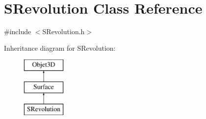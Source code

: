 \hypertarget{classSRevolution}{\section{S\-Revolution Class Reference}
\label{classSRevolution}
}


{\ttfamily \#include $<$S\-Revolution.\-h$>$}

Inheritance diagram for S\-Revolution\-:\begin{figure}[H]
\begin{center}
\leavevmode
\includegraphics[height=3.000000cm]{classSRevolution}
\end{center}
\end{figure}
